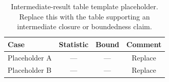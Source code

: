 \begin{table}[t]
\caption{Intermediate-result table template placeholder. Replace this with the
table supporting an intermediate closure or boundedness claim.}
\label{tbl:table-template-intermediate-one}
\centering
\small
\begin{tabular}{@{}l c c c@{}}
\toprule
Case & Statistic & Bound & Comment \\
\midrule
Placeholder A & --- & --- & Replace \\
Placeholder B & --- & --- & Replace \\
\bottomrule
\end{tabular}
\end{table}

